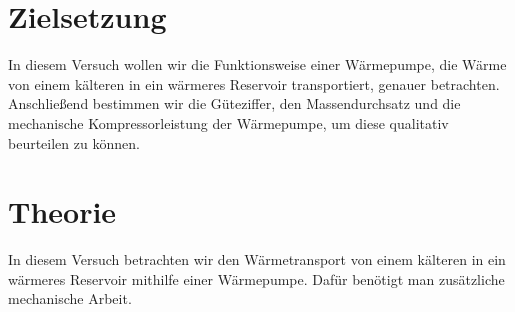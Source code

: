 \section{Zielsetzung}
\label{sec:Zielsetzung}
In diesem Versuch wollen wir die Funktionsweise einer Wärmepumpe, die Wärme von einem kälteren in ein wärmeres Reservoir transportiert, genauer betrachten.
Anschließend bestimmen wir die Güteziffer, den Massendurchsatz und die mechanische Kompressorleistung der Wärmepumpe, um diese qualitativ beurteilen zu können.  
\section{Theorie}
\label{sec:Theorie}
In diesem Versuch betrachten wir den Wärmetransport von einem kälteren in ein wärmeres Reservoir mithilfe einer Wärmepumpe.
Dafür benötigt man zusätzliche mechanische Arbeit.

